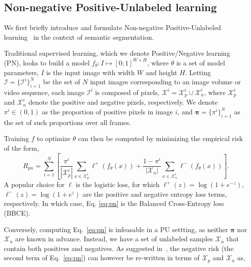 
\subsection{Non-negative Positive-Unlabeled learning}
\label{sec:nnpu}

We first briefly introduce and formulate Non-negative Positive-Unlabeled learning~\cite{kiryo17} in the context of semantic segmentation.

Traditional supervised learning, which we denote Positive/Negative learning (PN), looks to build a model \(f_{\theta}: I \mapsto [0;1]^{W \times H}\), where \(\theta\) is a set of model parameters, \(I\) is the input image with width $W$ and height $H$. Letting \(\bm{\mathcal{I}} = \{\mathcal{I}^i\}_{i=1}^{N}\) be the set of $N$ input images corresponding to an image volume or video sequence, 
each image $\mathcal{I}^i$ is composed of pixels, $\mathcal{X}^i=\mathcal{X}_p^i \cup \mathcal{X}_n^i$, where $\mathcal{X}_p^i$ and $\mathcal{X}_n^i$ denote the positive and negative pixels, respectively. We denote $\pi^i \in (0,1)$ as the proportion of positive pixels in image $i$, and $\bm{\pi} = \{\pi^i\}_{i=1}^{N}$ as the set of such proportions over all frames. 

Training $f$ to optimize $\theta$ can then be computed by minimizing the empirical risk of the form,
\begin{equation}
R_{pn}=\sum_{i=1}^{N} \left[ \frac{\pi^i}{|\mathcal{X}_p^i|}\sum_{x \in \mathcal{X}_p^i}\ell^+(f_{\theta}(x)) \right.+
\left. \frac{1-\pi^i}{|\mathcal{X}_n|} \sum_{x \in \mathcal{X}_n^i}\ell^-(f_{\theta}(x)) \right].
  \label{eq:pn}
\end{equation}
\noindent 
A popular choice for $\ell$ is the logistic loss, for which \(\ell^+(z)=\log(1+ e^{-z})\), \(\ell^-(z)=\log(1+e^{z})\) are the positive and negative entropy loss terms, respectively. In which case, Eq. \eqref{eq:pn} is the Balanced Cross-Entropy loss (BBCE).

Conversely, computing Eq.~\eqref{eq:pn} is infeasable in a PU settting, as neither $\bm{\pi}$ nor $\bm{\mathcal{X}}_{n}$ are known in advance. Instead, we have a set of unlabeled samples $\bm{\mathcal{X}}_{u}$ that contain both positives and negatives. As suggested in~\cite{duplessis15}, the negative risk (\ie the second term of Eq.~\eqref{eq:pn}) can however be re-written in terms of $\bm{\mathcal{X}}_{p}$ and $\bm{\mathcal{X}}_{u}$ as,

